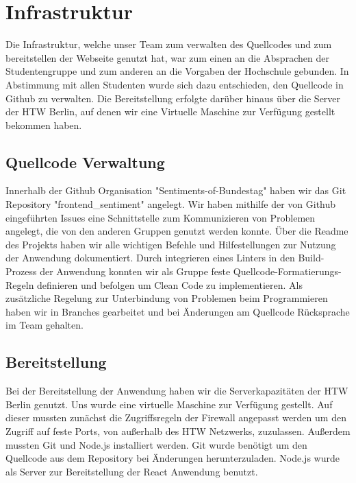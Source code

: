 \section{Infrastruktur}\label{sec:08_03_Infrastruktur}
Die Infrastruktur, welche unser Team zum verwalten des Quellcodes und zum bereitstellen der Webseite genutzt hat, war zum einen an die Absprachen der Studentengruppe und zum anderen an die Vorgaben der Hochschule gebunden. In Abstimmung mit allen Studenten wurde sich dazu entschieden, den Quellcode in Github zu verwalten. Die Bereitstellung erfolgte darüber hinaus über die Server der HTW Berlin, auf denen wir eine Virtuelle Maschine zur Verfügung gestellt bekommen haben.

\subsection{Quellcode Verwaltung}
Innerhalb der Github Organisation "Sentiments-of-Bundestag" haben wir das Git Repository "frontend\_sentiment" angelegt. Wir haben mithilfe der von Github eingeführten Issues eine Schnittstelle zum Kommunizieren von Problemen angelegt, die von den anderen Gruppen genutzt werden konnte. Über die Readme des Projekts haben wir alle wichtigen Befehle und Hilfestellungen zur Nutzung der Anwendung dokumentiert.
Durch integrieren eines Linters in den Build-Prozess der Anwendung konnten wir als Gruppe feste Quellcode-Formatierungs-Regeln definieren und befolgen um Clean Code zu implementieren. Als zusätzliche Regelung zur Unterbindung von Problemen beim Programmieren haben wir in Branches gearbeitet und bei Änderungen am Quellcode Rücksprache im Team gehalten. 

\subsection{Bereitstellung}
Bei der Bereitstellung der Anwendung haben wir die Serverkapazitäten der HTW Berlin genutzt. Uns wurde eine virtuelle Maschine zur Verfügung gestellt. Auf dieser mussten zunächst die Zugriffsregeln der Firewall angepasst werden um den Zugriff auf feste Ports, von außerhalb des HTW Netzwerks, zuzulassen. Außerdem mussten Git und Node.js installiert werden. Git wurde benötigt um den Quellcode aus dem Repository bei Änderungen herunterzuladen. Node.js wurde als Server zur Bereitstellung der React Anwendung benutzt.